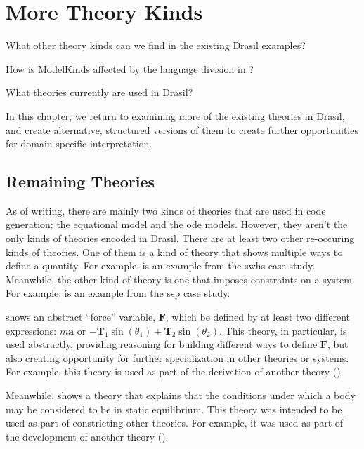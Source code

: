 \chapter{More Theory Kinds}
\label{chap:more-theory-kinds}

\begin{writingdirectives}
	\item What other theory kinds can we find in the existing Drasil examples?
	\item How is ModelKinds affected by the language division in
	?
	\item What theories currently are used in Drasil?
\end{writingdirectives}

In this chapter, we return to examining more of the existing theories in Drasil,
and create alternative, structured versions of them to create further
opportunities for domain-specific interpretation.

\section{Remaining Theories}
\label{chap:more-theory-kinds:sec:remaining-theories}

As of writing, there are mainly two kinds of theories that are used in code
generation: the equational model and the \acs{ode} models. However, they aren't
the only kinds of theories encoded in Drasil. There are at least two other
re-occuring kinds of theories. One of them is a kind of theory that shows
multiple ways to define a quantity. For example, 
is an example from the \acs{swhs} case study. Meanwhile, the other kind of
theory is one that imposes constraints on a system. For example,
 is an example from the \acs{ssp} case
study.

 shows an abstract ``force'' variable,
\(\mathbf{F}\), which be defined by at least two different expressions: \(m
\mathbf{a}\) or \(-{\mathbf{T}_{1}}
\sin\left({\theta_{1}}\right)+{\mathbf{T}_{2}} \sin\left({\theta_{2}}\right)\).
This theory, in particular, is used abstractly, providing reasoning for building
different ways to define \(\mathbf{F}\), but also creating opportunity for
further specialization in other theories or systems. For example, this theory is
used as part of the derivation of another theory
().

Meanwhile,  shows a theory that explains
that the conditions under which a body may be considered to be in static
equilibrium. This theory was intended to be used as part of constricting other
theories. For example, it was used as part of the development of another theory
().

